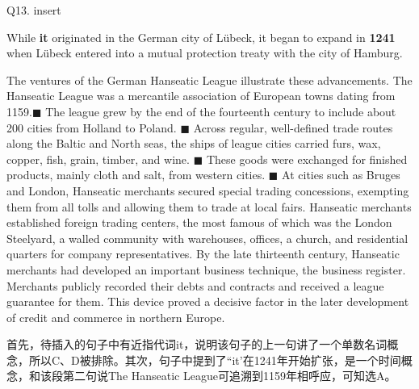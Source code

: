 \begin{blk}
    \begin{qst}
        Q13. insert

        While \textbf{it} originated in the German city of Lübeck, it began to expand in \textbf{1241} when Lübeck entered into a mutual protection treaty with the city of Hamburg.
    \end{qst}

    \begin{psgq}
        The ventures of the German Hanseatic League illustrate these advancements. The Hanseatic League was a mercantile association of European towns dating from 1159.$\blacksquare$ The league grew by the end of the fourteenth century to include about 200 cities from Holland to Poland. $\blacksquare$ Across regular, well-defined trade routes along the Baltic and North seas, the ships of league cities carried furs, wax, copper, fish, grain, timber, and wine. $\blacksquare$ These goods were exchanged for finished products, mainly cloth and salt, from western cities. $\blacksquare$ At cities such as Bruges and London, Hanseatic merchants secured special trading concessions, exempting them from all tolls and allowing them to trade at local fairs. Hanseatic merchants established foreign trading centers, the most famous of which was the London Steelyard, a walled community with warehouses, offices, a church, and residential quarters for company representatives. By the late thirteenth century, Hanseatic merchants had developed an important business technique, the business register. Merchants publicly recorded their debts and contracts and received a league guarantee for them. This device proved a decisive factor in the later development of credit and commerce in northern Europe.
    \end{psgq}

    \begin{nlz}
        首先，待插入的句子中有近指代词it，说明该句子的上一句讲了一个单数名词概念，所以C、D被排除。其次，句子中提到了“it'在1241年开始扩张，是一个时间概念，和该段第二句说The Hanseatic League可追溯到1159年相呼应，可知选A。
    \end{nlz}
\end{blk}
